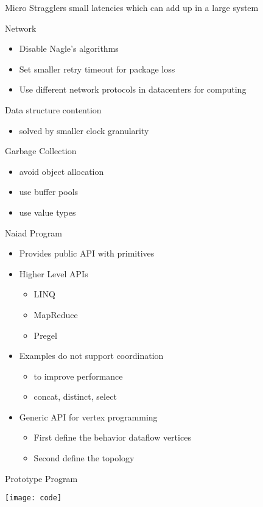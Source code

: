  \begin{frame}[t]{Micro Stragglers}
  \vspace{0.15cm}
small latencies which can add up in a large system
  \vspace{0.15cm}
 
Network

\begin{itemize}\setlength\itemsep{0.25cm}
\item Disable Nagle's algorithms
\item Set smaller retry timeout for package loss
\item Use different network protocols in datacenters for computing
\end{itemize}

Data structure contention
\begin{itemize}
\item solved by smaller clock granularity
\end{itemize}

Garbage Collection

\begin{itemize}\setlength\itemsep{0.25cm}
\item avoid object allocation
\item use buffer pools
\item use value types
\end{itemize}

\end{frame}

 \begin{frame}[t]{Naiad Program}
    \vspace{0.15cm}
    \begin{itemize}\setlength\itemsep{0.25cm}
     \item Provides public API with primitives
     \item Higher Level APIs
     \begin{itemize}\setlength\itemsep{0.25cm}
      \item LINQ
      \item MapReduce
      \item Pregel
     \end{itemize}
     \item Examples do not support coordination
     \begin{itemize}\setlength\itemsep{0.25cm}
     \item to improve performance
     \item concat, distinct, select
     \end{itemize}
     \item Generic API for vertex programming
     \begin{itemize}\setlength\itemsep{0.25cm}
     \item First define the behavior dataflow vertices
     \item Second define the topology
     \end{itemize}
   \end{itemize}

\end{frame}

\begin{frame}[t]{Prototype Program}

\begin{center}
  \texttt{[image: code]}
\end{center}

\end{frame}
